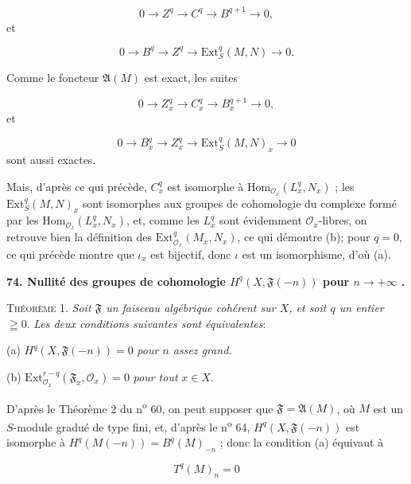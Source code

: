 \begin{equation*}
0 \rightarrow Z^q \rightarrow C^q \rightarrow B^{q+1} \rightarrow 0,
\end{equation*}
et

\begin{equation*}
0 \rightarrow B^q \rightarrow Z^q \rightarrow \mathrm{Ext}_S^q(M, N) \rightarrow 0.
\end{equation*}

Comme le foncteur $\mathfrak{A}(M)$ est exact, les suites

\begin{equation*}
0 \rightarrow Z_x^q \rightarrow C_x^q \rightarrow B_x^{q+1} \rightarrow 0,
\end{equation*}
et

\begin{equation*}
0 \rightarrow B_x^q \rightarrow Z_x^q \rightarrow \mathrm{Ext}_S^q(M, N)_x \rightarrow 0
\end{equation*}
sont aussi exactes.

Mais, d'après ce qui précède, $C_x^q$ est isomorphe à $\mathrm{Hom}_{\mathcal{O}_x}(L_x^q , N_x)$ ; les $\mathrm{Ext}_S^q(M, N)_x$ sont isomorphes aux groupes de cohomologie du complexe formé par les $\mathrm{Hom}_{\mathcal{O}_x}(L_x^q , N_x)$, et, comme les $L_x^q$ sont évidemment $\mathcal{O}_x$-libres, on retrouve bien la définition des $\mathrm{Ext}_{\mathcal{O}_x}^q(M_x , N_x)$, ce qui démontre (b); pour $q = 0$, ce qui précède montre que $\iota_x$ est bijectif, donc $\iota$ est un isomorphisme, d'où (a).

\textbf{74. Nullité des groupes de cohomologie $H^q(X, \mathfrak{F}(-n))$ pour $n \rightarrow +\infty$ .}

\textsc{Théorème} 1. \textit{Soit $\mathfrak{F}$ un faisceau algébrique cohérent sur $X$, et soit $q$ un entier} $\geqq 0$. \textit{Les deux conditions suivantes sont équivalentes}:

(a) $H^q(X, \mathfrak{F}(-n)) = 0$ \textit{pour $n$ assez grand.}

(b) $\mathrm{Ext}_{\mathcal{O}_x}^{r-q}(\mathfrak{F}_x , \mathcal{O}_x) = 0$ \textit{pour tout} $x \in X$.

D'après le Théorème 2 du n\textsuperscript{o} 60, on peut supposer que $\mathfrak{F} = \mathfrak{A}(M)$, où $M$ est un $S$-module gradué de type fini, et, d'après le n\textsuperscript{o} 64, $H^q(X, \mathfrak{F}(-n))$ est isomorphe à $H^q(M(-n)) = B^q(M)_{-n}$ ; donc la condition (a) équivaut à

\begin{equation*}
T^q(M)_n = 0
\end{equation*}

